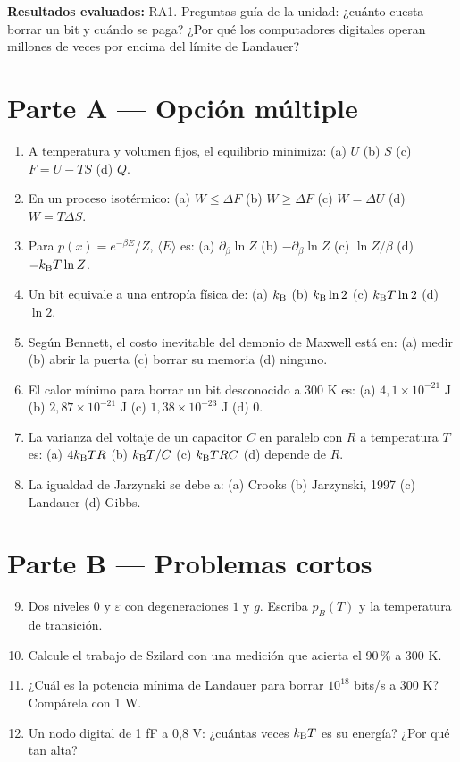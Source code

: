 \documentclass[11pt,a4paper]{article}
\begin{document}
\noindent\textbf{Resultados evaluados:} RA1. Preguntas guía de la unidad: ¿cuánto cuesta borrar un bit y cuándo se paga?
¿Por qué los computadores digitales operan millones de veces por encima del límite de Landauer?

\section*{Parte A — Opción múltiple}
\begin{enumerate}
\item A temperatura y volumen fijos, el equilibrio minimiza: (a) $U$ \quad (b) $S$ \quad (c) $F=U-TS$ \quad (d) $Q$.
\item En un proceso isotérmico: (a) $W\le\Delta F$ \quad (b) $W\ge\Delta F$ \quad (c) $W=\Delta U$ \quad (d) $W=T\Delta S$.
\item Para $p(x)=e^{-\beta E}/Z$, $\langle E\rangle$ es: (a) $\partial_\beta\ln Z$ \quad (b) $-\partial_\beta\ln Z$ \quad (c) $\ln Z/\beta$ \quad (d) $-k_{\mathrm B} T\ln Z$.
\item Un bit equivale a una entropía física de: (a) $k_{\mathrm B}$ \quad (b) $k_{\mathrm B}\ln2$ \quad (c) $k_{\mathrm B} T\ln2$ \quad (d) $\ln2$.
\item Según Bennett, el costo inevitable del demonio de Maxwell está en: (a) medir \quad (b) abrir la puerta \quad (c) borrar su memoria \quad (d) ninguno.
\item El calor mínimo para borrar un bit desconocido a 300 K es: (a) $4{,}1\times10^{-21}$ J \quad (b) $2{,}87\times10^{-21}$ J \quad (c) $1{,}38\times10^{-23}$ J \quad (d) 0.
\item La varianza del voltaje de un capacitor $C$ en paralelo con $R$ a temperatura $T$ es: (a) $4k_{\mathrm B} TR$ \quad (b) $k_{\mathrm B} T/C$ \quad (c) $k_{\mathrm B} TRC$ \quad (d) depende de $R$.
\item La igualdad de Jarzynski se debe a: (a) Crooks \quad (b) Jarzynski, 1997 \quad (c) Landauer \quad (d) Gibbs.
\end{enumerate}

\section*{Parte B — Problemas cortos}
\begin{enumerate}\setcounter{enumi}{8}
\item Dos niveles $0$ y $\varepsilon$ con degeneraciones $1$ y $g$. Escriba $p_B(T)$ y la temperatura de transición.
\item Calcule el trabajo de Szilard con una medición que acierta el 90\,\% a 300 K.
\item ¿Cuál es la potencia mínima de Landauer para borrar $10^{18}$ bits/s a 300 K? Compárela con 1 W.
\item Un nodo digital de 1 fF a 0,8 V: ¿cuántas veces $k_{\mathrm B} T$ es su energía? ¿Por qué tan alta?
\end{enumerate}
\end{document}
